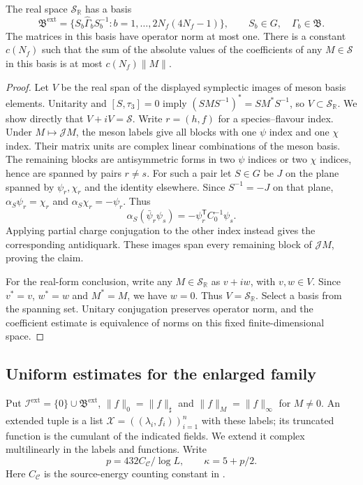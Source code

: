 \documentclass[11pt,letterpaper,reqno]{amsart}
\makeatletter
\theoremstyle{definition}
\newcommand{\ms@minorstart}{%
  \pushQED{\qed}\renewcommand{\qedsymbol}{$\blacksquare$}}
\newenvironment{lemma}[1][]{\ms@minorstart\ms@lemma[#1]}
  {\popQED\endms@lemma}
\theoremstyle{remark}
\makeatother
\begin{document}
\begin{lemma}[A basis obtained from mesons]\label{C-401-19}
The real space $\mathscr S_{\mathbb R}$ has a basis
\[
 \mathfrak B^{\mathrm{ext}}
   =\{S_b\widehat\Gamma_bS_b^{-1}:b=1,\ldots,
                                      2N_f(4N_f-1)\},
 \qquad S_b\in G,\quad\Gamma_b\in\mathfrak B.
\]
The matrices in this basis have operator norm at most one.
There is a constant $c(N_f)$ such that the sum of the absolute
values of the coefficients of any $M\in\mathscr S$ in this
basis is at most $c(N_f)\|M\|$.
\end{lemma}

\begin{proof}
Let $V$ be the real span of the displayed symplectic images of
meson basis elements. Unitarity and $[S,\tau_3]=0$ imply
$(SMS^{-1})^*=SM^*S^{-1}$, so $V\subset\mathscr S_{\mathbb R}$.
We show directly that $V+iV=\mathscr S$.
Write $r=(h,f)$ for a species--flavour index. Under
$M\mapsto\mathcal JM$, the meson labels give all blocks
with one $\psi$ index and one $\chi$ index. Their matrix
units are complex linear combinations of the meson basis.
The remaining blocks are antisymmetric forms in two $\psi$
indices or two $\chi$ indices, hence are spanned by pairs
$r\ne s$. For such a pair let $S\in G$ be $J$ on the plane
spanned by $\psi_r,\chi_r$ and the identity elsewhere.
Since $S^{-1}=-J$ on that plane,
$\alpha_S\psi_r=\chi_r$ and $\alpha_S\chi_r=-\psi_r$.
Thus
\[
 \alpha_S(\bar\psi_r\psi_s)
       =-\psi_r^{\mathsf T}C_0^{-1}\psi_s.
\]
Applying partial charge conjugation to the other index
instead gives the corresponding antidiquark. These images
span every remaining block of $\mathcal JM$, proving the claim.

For the real-form conclusion, write any
$M\in\mathscr S_{\mathbb R}$ as $v+iw$, with $v,w\in V$.
Since $v^*=v$, $w^*=w$ and $M^*=M$, we have $w=0$.
Thus $V=\mathscr S_{\mathbb R}$. Select a basis from the spanning
set. Unitary conjugation preserves operator norm, and the
coefficient estimate is equivalence of norms on this fixed
finite-dimensional space.
\end{proof}

\subsection{Uniform estimates for the enlarged family}

Put $\mathcal I^{\mathrm{ext}}=\{0\}\cup\mathfrak B^{\mathrm{ext}}$,
$\|f\|_0=\|f\|_\sharp$ and $\|f\|_M=\|f\|_\infty$ for
$M\ne0$. An extended tuple is a list
$\mathcal X=((\lambda_i,f_i))_{i=1}^n$ with these labels;
its truncated function is the cumulant of the indicated fields.
We extend it complex multilinearly in the labels and functions.
Write
\[
 p=432C_{\mathscr C}/\log L,\qquad \kappa=5+p/2.
\]
Here $C_{\mathscr C}$ is the source-energy counting constant
in \cite[Thm. F]{QCDM1}.
\end{document}
